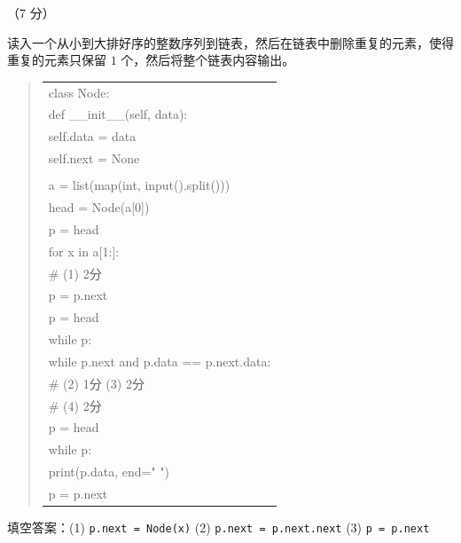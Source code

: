 \begin{question}[链表去重]（7 分）

读入一个从小到大排好序的整数序列到链表，然后在链表中删除重复的元素，使得重复的元素只保留 $1$ 个，然后将整个链表内容输出。

\begin{quote}
\footnotesize
\begin{tabular}{@{}l@{}}
class Node:\\
    def \_\_init\_\_(self, data):\\
        self.data = data\\
        self.next = None\\
\\
a = list(map(int, input().split()))\\
head = Node(a[0])\\
p = head\\
for x in a[1:]:\\
\underline{\hspace{12em}} \# (1) 2分\\
    p = p.next\\
p = head\\
while p:\\
    while p.next and p.data == p.next.data:\\
\underline{\hspace{12em}} \# (2) 1分 (3) 2分\\
\underline{\hspace{12em}} \# (4) 2分\\
p = head\\
while p:\\
    print(p.data, end=" ")\\
    p = p.next\\
\end{tabular}
\end{quote}

\begin{solution}
填空答案：(1) \texttt{p.next = Node(x)} (2) \texttt{p.next = p.next.next} (3) \texttt{p = p.next}
\end{solution}
\end{question}

